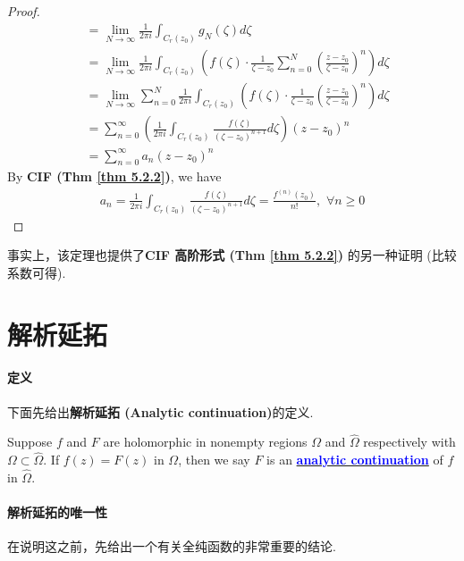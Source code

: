 \begin{thm}
\begin{proof}
\begin{align}
				&= \lim_{N \to \infty}{\frac{1}{2 \pi i} \int_{C_{r}(z_0)}{g_{N}(\zeta) d\zeta}} \\
				&= \lim_{N \to \infty}{\frac{1}{2 \pi i} \int_{C_{r}(z_0)}{ \left( f(\zeta) \cdot \frac{1}{\zeta - z_0} \sum_{n = 0}^{N}{\left( \frac{z - z_0}{\zeta - z_0} \right)^n } \right) d\zeta } } \\
				&= \lim_{N \to \infty}{\sum_{n = 0}^{N} \frac{1}{2 \pi i} \int_{C_{r}(z_0)}{ \left( f(\zeta) \cdot \frac{1}{\zeta - z_0} \left( \frac{z - z_0}{\zeta - z_0} \right)^n \right) d\zeta } } \\
				&= \sum_{n = 0}^{\infty} \left( \frac{1}{2 \pi i} \int_{C_{r}(z_0)}{ \frac{f(\zeta)}{(\zeta - z_0)^{n + 1}} d\zeta } \right) (z - z_0)^n \\
				&= \sum_{n = 0}^{\infty}{a_n (z - z_0)^n}
			\end{align}
			By \textbf{CIF (Thm \ref{thm 5.2.2})}, we have
			\begin{align}
				a_n = \frac{1}{2 \pi i} \int_{C_{r}(z_0)}{ \frac{f(\zeta)}{(\zeta - z_0)^{n + 1}} d\zeta } = \frac{f^{(n)}(z_0)}{n!} , \,\, \forall n \geq 0
			\end{align}
		\end{proof}
	
		\begin{rmk}
			事实上，该定理也提供了\textbf{CIF 高阶形式 (Thm \ref{thm 5.2.2})} 的另一种证明 (比较系数可得).
		\end{rmk}
	\end{thm}

\newpage

\section{解析延拓}
\paragraph{定义}
	下面先给出\textbf{解析延拓 (Analytic continuation)}的定义.
	\begin{defn}\label{def 6.3.1}
		Suppose $f$ and $F$ are holomorphic in nonempty regions $\Omega$ and $\hat{\Omega}$ respectively with $\Omega \subset \hat{\Omega}$. If $f(z) = F(z)$ in $\Omega$, then we say $F$ is an \underline{\textcolor{blue}{\textbf{analytic continuation}}} of $f$ in $\hat{\Omega}$.
	\end{defn}

\vspace{2em}
\paragraph{解析延拓的唯一性}
	在说明这之前，先给出一个有关全纯函数的非常重要的结论.
	
